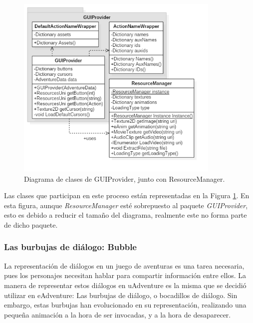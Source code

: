 \begin{figure}[h!]
	\centerline{\includegraphics[height=3.5in]{figures/it2/GUIProvider.png}}
	\caption[GUIProvider - Versión Final]{Diagrama de clases de GUIProvider, junto con ResourceManager.}
	\label{guiproviderit2}
\end{figure}

Las clases que participan en este proceso están representadas en la Figura \ref{guiproviderit2}. En esta figura, aunque \textit{ResourceManager} esté sobrepuesto al paquete \textit{GUIProvider}, esto es debido a reducir el tamaño del diagrama, realmente este no forma parte de dicho paquete.

\subsubsection{Las burbujas de diálogo: Bubble}

La representación de diálogos en un juego de aventuras es una tarea necesaria, pues los personajes necesitan hablar para compartir información entre ellos. La manera de representar estos diálogos en uAdventure es la misma que se decidió utilizar en eAdventure: Las burbujas de diálogo, o bocadillos de diálogo. Sin embargo, estas burbujas han evolucionado en su representación, realizando una pequeña animación a la hora de ser invocadas, y a la hora de desaparecer.

